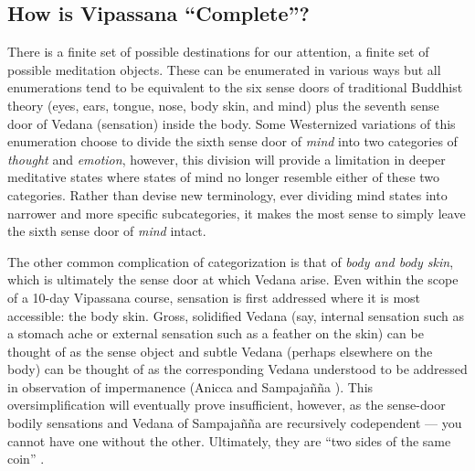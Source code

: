 \documentclass[a4paper, amsfonts, amssymb, amsmath, reprint, showkeys, nofootinbib, twoside]{revtex4-1}
\begin{document}
\subsection{How is Vipassana ``Complete''?}

There is a finite set of possible destinations for our attention, a finite set of
possible meditation objects. These can be
enumerated in various ways but all enumerations tend to be equivalent to the six
sense doors of traditional Buddhist theory (eyes, ears, tongue, nose, body skin, and mind) plus
the seventh sense door of Vedana
(sensation) inside the body. Some Westernized variations of this enumeration choose
to divide the sixth sense door of \textit{mind} into two categories of
\textit{thought} and \textit{emotion}, however, this division will provide a
limitation in deeper meditative states where states of mind no longer resemble either
of these two categories. Rather than devise new terminology, ever dividing mind
states into narrower and more specific subcategories, it makes the most sense to
simply leave the sixth sense door of \textit{mind} intact.


The other common
complication of categorization is that of \textit{body and body skin}, which is ultimately the sense
door at which Vedana arise. Even within the scope of a 10-day Vipassana course,
sensation is first addressed where it is most accessible: the body skin. Gross,
solidified Vedana (say, internal sensation such as
a stomach ache or external sensation such as a feather on the skin) can be thought of
as the sense object and subtle Vedana (perhaps elsewhere on the body) can be thought of as the corresponding Vedana
understood to be addressed in observation of impermanence (Anicca and Sampajañña
). This oversimplification will eventually prove insufficient, however,
as the sense-door bodily sensations and Vedana of Sampajañña are recursively
codependent --- you cannot have one without the other. Ultimately, they are ``two
sides of the same coin'' .

\end{document}
